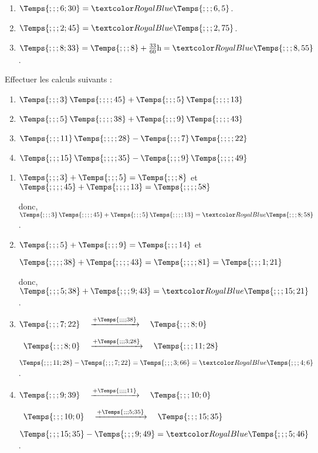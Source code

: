 \begin{Maquette}[Fiche,CorrigeFin,Colonnes=2]{}
\begin{multicols}{2}
      \begin{Solution}
         \begin{enumerate}
            \item $\Temps{;;;6;30} =\cor{\Temps{;;;6,5}}$.
            \item $\Temps{;;;2;45} =\cor{\Temps{;;;2,75}}$. \smallskip
            \item $\Temps{;;;8;33} =\Temps{;;;8}+\frac{33}{60}\text{h} =\cor{\Temps{;;;8,55}}$.
         \end{enumerate}
      \end{Solution}
       
      
      \begin{exercice} %
         Effectuer les calculs suivants :
         \begin{enumerate}
            \item $\Temps{;;;3}\,\Temps{;;;;45}+\Temps{;;;5}\,\Temps{;;;;13}$
            \item $\Temps{;;;5}\,\Temps{;;;;38}+\Temps{;;;9}\,\Temps{;;;;43}$
            \item $\Temps{;;;11}\,\Temps{;;;;28}-\Temps{;;;7}\,\Temps{;;;;22}$
            \item $\Temps{;;;15}\,\Temps{;;;;35}-\Temps{;;;9}\,\Temps{;;;;49}$
         \end{enumerate}
      \end{exercice}
      
      \begin{Solution}
         \begin{enumerate}
            \item $\Temps{;;;3}+\Temps{;;;5} =\Temps{;;;8}$ et $\Temps{;;;;45}+\Temps{;;;;13} =\Temps{;;;;58}$ \par
               donc, $\Temps{;;;3}\,\Temps{;;;;45}+\Temps{;;;5}\,\Temps{;;;;13} =\cor{\Temps{;;;8;58}}$.
            \item $\Temps{;;;5}+\Temps{;;;9} =\Temps{;;;14}$ et \par
               $\Temps{;;;;38}+\Temps{;;;;43} =\Temps{;;;;81} =\Temps{;;;1;21}$ \par
               donc, $\Temps{;;;5;38}+\Temps{;;;9;43} =\cor{\Temps{;;;15;21}}$.
            \item $\Temps{;;;7;22} \quad \xrightarrow{+\Temps{;;;;38}} \quad \Temps{;;;8;0}$ \par
               \quad\, $\Temps{;;;8;0} \quad \xrightarrow{+\Temps{;;;3;28}} \quad \Temps{;;;11;28}$ \par
               $\Temps{;;;11;28}-\Temps{;;;7;22} =\Temps{;;;3;66} =\cor{\Temps{;;;4;6}}$.
            \item $\Temps{;;;9;39} \quad \xrightarrow{+\Temps{;;;;11}} \quad \Temps{;;;10;0}$ \par
               \quad\, $\Temps{;;;10;0} \quad \xrightarrow{+\Temps{;;;5;35}} \quad \Temps{;;;15;35}$ \par  
               $\Temps{;;;15;35}-\Temps{;;;9;49} =\cor{\Temps{;;;5;46}}$.
         \end{enumerate}
      \end{Solution}



\end{multicols}
\end{Maquette}
